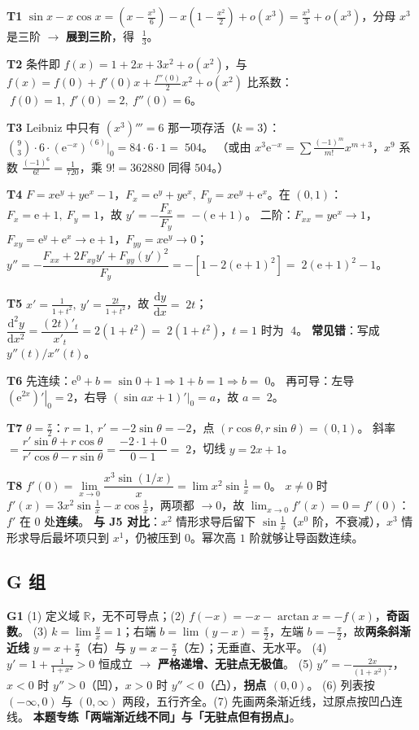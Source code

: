 \documentclass[11pt,a4paper]{ctexart}
\newcommand{\R}{\mathbb{R}}
\newcommand{\ee}{\mathrm{e}}
\newcommand{\D}{\mathrm{d}}
\newcommand{\ans}[1]{\;\boxed{#1}}
\begin{document}
\textbf{T1} $\sin x-x\cos x=\left(x-\frac{x^3}6\right)-x\left(1-\frac{x^2}2\right)+o(x^3)=\frac{x^3}3+o(x^3)$，分母 $x^3$ 是三阶 $\to$ \textbf{展到三阶}，得 $\ans{\frac13}$。

\textbf{T2} 条件即 $f(x)=1+2x+3x^2+o(x^2)$，与 $f(x)=f(0)+f'(0)x+\frac{f''(0)}2x^2+o(x^2)$ 比系数：
$\ans{f(0)=1,\ f'(0)=2,\ f''(0)=6}$。

\textbf{T3} Leibniz 中只有 $(x^3)'''=6$ 那一项存活（$k=3$）：
$\binom93\cdot6\cdot\left(\ee^{-x}\right)^{(6)}\big|_0=84\cdot6\cdot1=\ans{504}$。
（或由 $x^3\ee^{-x}=\sum\frac{(-1)^m}{m!}x^{m+3}$，$x^9$ 系数 $\frac{(-1)^6}{6!}=\frac1{720}$，乘 $9!=362880$ 同得 $504$。）

\textbf{T4} $F=x\ee^y+y\ee^x-1$，$F_x=\ee^y+y\ee^x,\ F_y=x\ee^y+\ee^x$。在 $(0,1)$：$F_x=\ee+1,\ F_y=1$，故 $y'=-\dfrac{F_x}{F_y}=\ans{-(\ee+1)}$。
二阶：$F_{xx}=y\ee^x\to1$，$F_{xy}=\ee^y+\ee^x\to\ee+1$，$F_{yy}=x\ee^y\to0$；
$y''=-\dfrac{F_{xx}+2F_{xy}y'+F_{yy}(y')^2}{F_y}=-\left[1-2(\ee+1)^2\right]=\ans{2(\ee+1)^2-1}$。

\textbf{T5} $x'=\frac1{1+t^2},\ y'=\frac{2t}{1+t^2}$，故 $\dfrac{\D y}{\D x}=\ans{2t}$；
$\dfrac{\D^2y}{\D x^2}=\dfrac{(2t)'_t}{x'_t}=2(1+t^2)=\ans{2(1+t^2)}$，$t=1$ 时为 $\ans{4}$。
\textbf{常见错}：写成 $y''(t)/x''(t)$。

\textbf{T6} 先连续：$\ee^{0}+b=\sin0+1\Rightarrow 1+b=1\Rightarrow b=\ans{0}$。
再可导：左导 $\left.(\ee^{2x})'\right|_0=2$，右导 $\left.(\sin ax+1)'\right|_0=a$，故 $a=\ans{2}$。

\textbf{T7} $\theta=\frac\pi2$：$r=1,\ r'=-2\sin\theta=-2$，点 $(r\cos\theta,r\sin\theta)=(0,1)$。
斜率 $=\dfrac{r'\sin\theta+r\cos\theta}{r'\cos\theta-r\sin\theta}=\dfrac{-2\cdot1+0}{0-1}=\ans{2}$，切线 $y=2x+1$。

\textbf{T8} $f'(0)=\lim\limits_{x\to0}\dfrac{x^3\sin(1/x)}x=\lim x^2\sin\frac1x=0$。
$x\ne0$ 时 $f'(x)=3x^2\sin\frac1x-x\cos\frac1x$，两项都 $\to0$，故 $\lim_{x\to0}f'(x)=0=f'(0)$：$f'$ 在 $0$ 处\textbf{连续}。
\textbf{与 J5 对比}：$x^2$ 情形求导后留下 $\sin\frac1x$（$x^0$ 阶，不衰减），$x^3$ 情形求导后最坏项只到 $x^1$，仍被压到 $0$。幂次高 $1$ 阶就够让导函数连续。

\subsection{G 组}

\textbf{G1} (1) 定义域 $\R$，无不可导点；(2) $f(-x)=-x-\arctan x=-f(x)$，\textbf{奇函数}。
(3) $k=\lim\frac yx=1$；右端 $b=\lim(y-x)=\frac\pi2$，左端 $b=-\frac\pi2$，故\textbf{两条斜渐近线} $y=x+\frac\pi2$（右）与 $y=x-\frac\pi2$（左）；无垂直、无水平。
(4) $y'=1+\frac1{1+x^2}>0$ 恒成立 $\to$ \textbf{严格递增、无驻点无极值}。
(5) $y''=-\frac{2x}{(1+x^2)^2}$，$x<0$ 时 $y''>0$（凹），$x>0$ 时 $y''<0$（凸），\textbf{拐点 $(0,0)$}。
(6) 列表按 $(-\infty,0)$ 与 $(0,\infty)$ 两段，五行齐全。(7) 先画两条渐近线，过原点按凹凸连线。
\textbf{本题专练「两端渐近线不同」与「无驻点但有拐点」}。
\end{document}
